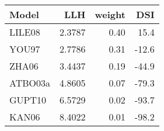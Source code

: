 \begin{tabular}{lrrr}
\toprule
   Model &     LLH &  weight &   DSI \\
\midrule
  LILE08 &  2.3787 &    0.40 &  15.4 \\
   YOU97 &  2.7786 &    0.31 & -12.6 \\
   ZHA06 &  3.4437 &    0.19 & -44.9 \\
 ATBO03a &  4.8605 &    0.07 & -79.3 \\
  GUPT10 &  6.5729 &    0.02 & -93.7 \\
   KAN06 &  8.4022 &    0.01 & -98.2 \\
\bottomrule
\end{tabular}
